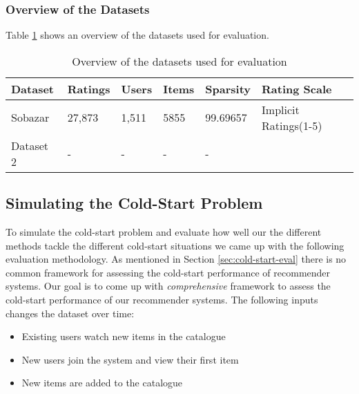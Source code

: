 \subsubsection{Overview of the Datasets}

Table \ref{table:datasets} shows an overview of the datasets used for evaluation.


\begin{table}[H]
    \centering
    \begin{tabular}{l l l l l l }
    \toprule
	Dataset			& 	Ratings 	& 	Users	& 	Items 	& 	Sparsity	& Rating Scale 				\\ \midrule
	Sobazar 		& 	27,873  	& 	1,511	&	5855	&	99.69657	& Implicit Ratings(1-5)		\\ 
	Dataset 2 		& 	-  			& 	-		&	-		&	-			&							\\
	\bottomrule
    \end{tabular}
    \caption [Overview of the datasets used for evaluation]{Overview of the datasets used for evaluation}
    \label{table:datasets}
\end{table}

\subsection{Simulating the Cold-Start Problem}

To simulate the cold-start problem and evaluate how well our the different
methods tackle the different cold-start situations we came up with the following
evaluation methodology. As mentioned in Section \ref{sec:cold-start-eval} there is
no common framework for assessing the cold-start performance of recommender systems.
Our goal is to come up with \emph{comprehensive} framework to assess the cold-start
performance of our recommender systems. The following inputs changes the dataset over time:

\begin{itemize}
	\item 	Existing users watch new items in the catalogue
	\item	New users join the system and view their first item
	\item	New items are added to the catalogue
\end{itemize}

